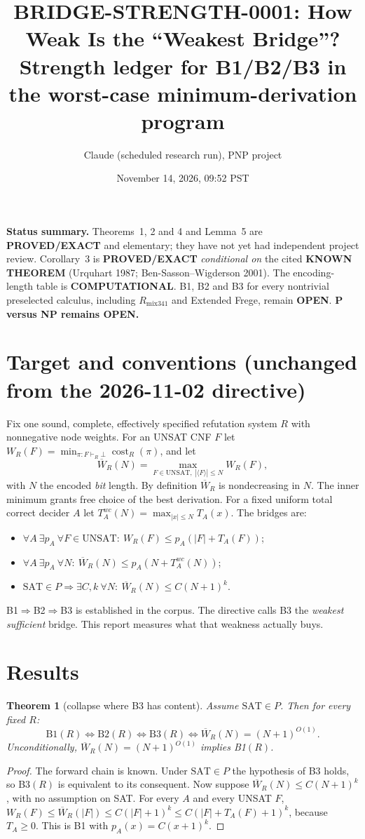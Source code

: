 \documentclass[11pt]{article}
\title{BRIDGE-STRENGTH-0001: How Weak Is the ``Weakest Bridge''?\\
\large Strength ledger for B1/B2/B3 in the worst-case minimum-derivation program}
\author{Claude (scheduled research run), PNP project}
\date{November 14, 2026, 09:52 PST}
\newtheorem{theorem}{Theorem}
\theoremstyle{definition}
\newcommand{\Wb}{\overline W}
\begin{document}
\maketitle

\noindent\textbf{Status summary.}
Theorems~1, 2 and 4 and Lemma~5 are \textbf{PROVED/EXACT} and elementary;
they have not yet had independent project review. Corollary~3 is
\textbf{PROVED/EXACT} \emph{conditional on} the cited
\textbf{KNOWN THEOREM} (Urquhart 1987; Ben-Sasson--Wigderson 2001). The
encoding-length table is \textbf{COMPUTATIONAL}. B1, B2 and B3 for every
nontrivial preselected calculus, including $R_{\mathrm{mix341}}$ and Extended
Frege, remain \textbf{OPEN}. \textbf{P versus NP remains OPEN.}

\section{Target and conventions (unchanged from the 2026-11-02 directive)}
Fix one sound, complete, effectively specified refutation system $R$ with
nonnegative node weights. For an UNSAT CNF $F$ let
$W_R(F)=\min_{\pi:F\vdash_R\bot}\operatorname{cost}_R(\pi)$, and let
\[
  \Wb_R(N)=\max_{F\in\mathrm{UNSAT},\ |\langle F\rangle|\le N} W_R(F),
\]
with $N$ the encoded \emph{bit} length. By definition $\Wb_R$ is
nondecreasing in $N$. The inner minimum grants free choice of the best
derivation. For a fixed uniform total correct decider $A$ let
$T_A^{wc}(N)=\max_{|x|\le N}T_A(x)$. The bridges are:
\begin{itemize}
\item[B1] $\forall A\ \exists p_A\ \forall F\in\mathrm{UNSAT}:\ W_R(F)\le p_A(|F|+T_A(F))$;
\item[B2] $\forall A\ \exists p_A\ \forall N:\ \Wb_R(N)\le p_A(N+T_A^{wc}(N))$;
\item[B3] $\mathrm{SAT}\in P\Rightarrow \exists C,k\ \forall N:\ \Wb_R(N)\le C(N+1)^k$.
\end{itemize}
B1$\Rightarrow$B2$\Rightarrow$B3 is established in the corpus. The directive
calls B3 the \emph{weakest sufficient} bridge. This report measures what that
weakness actually buys.

\section{Results}

\begin{theorem}[collapse where B3 has content]\label{thm:collapse}
Assume $\mathrm{SAT}\in P$. Then for every fixed $R$:
\[
 \mathrm{B1}(R)\iff\mathrm{B2}(R)\iff\mathrm{B3}(R)\iff \Wb_R(N)=(N+1)^{O(1)}.
\]
Unconditionally, $\Wb_R(N)=(N+1)^{O(1)}$ implies B1$(R)$.
\end{theorem}
\begin{proof}
The forward chain is known. Under $\mathrm{SAT}\in P$ the hypothesis of B3
holds, so B3$(R)$ is equivalent to its consequent. Now suppose
$\Wb_R(N)\le C(N+1)^k$, with no assumption on SAT. For every $A$ and every
UNSAT $F$,
$W_R(F)\le\Wb_R(|F|)\le C(|F|+1)^k\le C(|F|+T_A(F)+1)^k$, because
$T_A\ge 0$. This is B1 with $p_A(x)=C(x+1)^k$.
\end{proof}
\end{document}
